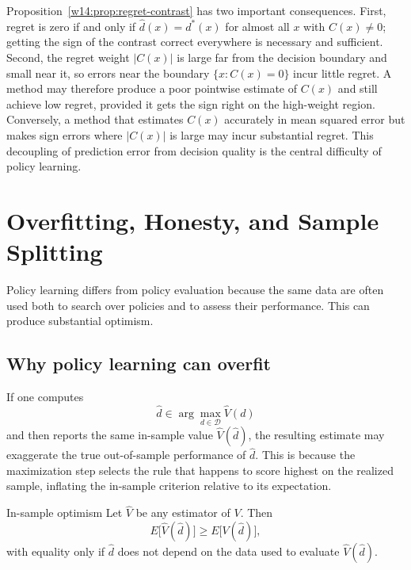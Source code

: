 \documentclass[master.tex]{subfiles}
\begin{document}
\begin{remark}
Proposition~\ref{w14:prop:regret-contrast} has two important consequences.
First, regret is zero if and only if \(\hat d(x)=d^\ast(x)\) for almost all \(x\)
with \(C(x)\neq 0\); getting the sign of the contrast correct everywhere is
necessary and sufficient. Second, the regret weight \(|C(x)|\) is large far
from the decision boundary and small near it, so errors near the boundary
\(\{x:C(x)=0\}\) incur little regret. A method may therefore produce a poor
pointwise estimate of \(C(x)\) and still achieve low regret, provided it gets
the sign right on the high-weight region. Conversely, a method that estimates
\(C(x)\) accurately in mean squared error but makes sign errors where \(|C(x)|\)
is large may incur substantial regret. This decoupling of prediction error from
decision quality is the central difficulty of policy learning.
\end{remark}

\section{Overfitting, Honesty, and Sample Splitting}
\label{w14:sec:honesty}

Policy learning differs from policy evaluation because the same data are often used both to search over policies and to assess their performance. This can produce substantial optimism.

\subsection{Why policy learning can overfit}

If one computes
\[
\hat d\in\arg\max_{d\in\mathcal D}\widehat V(d)
\]
and then reports the same in-sample value \(\widehat V(\hat d)\), the
resulting estimate may exaggerate the true out-of-sample performance of
\(\hat d\). This is because the maximization step selects the rule that
happens to score highest on the realized sample, inflating the in-sample
criterion relative to its expectation.

\begin{prop}{In-sample optimism}
\label{w14:prop:optimism}
Let \(\widehat V\) be any estimator of \(V\). Then
\[
E\bigl[\widehat V(\hat d)\bigr] \geq E\bigl[V(\hat d)\bigr],
\]
with equality only if \(\hat d\) does not depend on the data used to evaluate
\(\widehat V(\hat d)\).
\end{prop}
\end{document}
